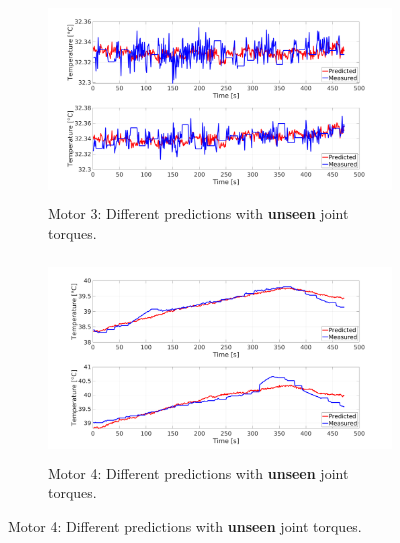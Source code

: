 \documentclass{ifacconf}
\begin{document}
\begin{figure}[t!]
    \begin{subfigure}[t]{0.5\textwidth}
		\centering
		\includegraphics[height=2.1in, width=\linewidth, keepaspectratio]{./pictures/applications/feedback/table/j3.png}
		\caption{Motor 3: Different predictions with \textbf{unseen} joint torques.}
	\end{subfigure}%
	\begin{subfigure}[t]{0.5\textwidth}
		\centering
		\includegraphics[height=2.1in, width=\linewidth, keepaspectratio]{./pictures/applications/feedback/table/j4.png}
		\caption{Motor 4: Different predictions with \textbf{unseen} joint torques.}
	\end{subfigure}

    \vspace{1ex} 


\end{figure}
\end{document}
